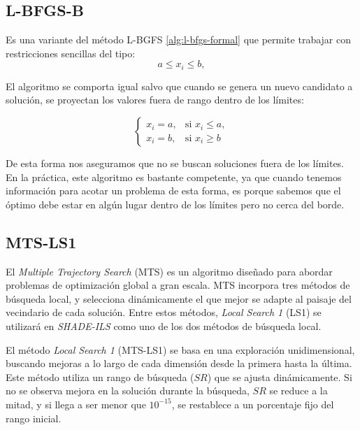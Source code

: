 \subsection{L-BFGS-B}
Es una variante del método L-BGFS \ref{alg:l-bfgs-formal} que permite trabajar con restricciones sencillas del tipo:
\begin{equation}
	a \leq x_i \leq b,
\end{equation}

El algoritmo se comporta igual salvo que cuando se genera un nuevo candidato a solución, se proyectan los valores fuera de rango dentro de los límites:

\begin{equation}
\begin{cases}
    x_i = a, & \text{si } x_i \leq a, \\
    x_i = b, & \text{si } x_i \geq b
\end{cases}
\end{equation}

De esta forma nos aseguramos que no se buscan soluciones fuera de los límites. En la práctica, este algoritmo es bastante competente, ya que cuando tenemos información para acotar un problema de esta forma, es porque sabemos que el óptimo debe estar en algún lugar dentro de los límites pero no cerca del borde.

\subsection{MTS-LS1}

El \textit{Multiple Trajectory Search} (MTS) \cite{MTS_LS1} es un algoritmo diseñado para abordar problemas de optimización global a gran escala. MTS incorpora tres métodos de búsqueda local, y selecciona dinámicamente el que mejor se adapte al paisaje del vecindario de cada solución. Entre estos métodos, \textit{Local Search 1} (LS1) se utilizará en \textit{SHADE-ILS} como uno de los dos métodos de búsqueda local.

\vspace{10px}

El método \textit{Local Search 1} (MTS-LS1) se basa en una exploración unidimensional, buscando mejoras a lo largo de cada dimensión desde la primera hasta la última. Este método utiliza un rango de búsqueda ($SR$) que se ajusta dinámicamente. Si no se observa mejora en la solución durante la búsqueda, $SR$ se reduce a la mitad, y si llega a ser menor que $10^{-15}$, se restablece a un porcentaje fijo del rango inicial.

